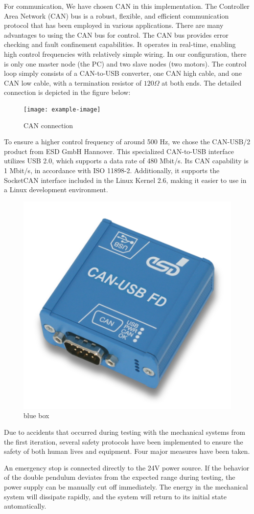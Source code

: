 For communication, We have chosen CAN in this implementation. The Controller Area Network (CAN) bus is a robust, flexible, and efficient communication protocol that has been employed in various applications. There are many advantages to using the CAN bus for control. The CAN bus provides error checking and fault confinement capabilities. It operates in real-time, enabling high control frequencies with relatively simple wiring. In our configuration, there is only one master node (the PC) and two slave nodes (two motors). The control loop simply consists of a CAN-to-USB converter, one CAN high cable, and one CAN low cable, with a termination resistor of \(120 \Omega\) at both ends. The detailed connection is depicted in the figure below:

\begin{figure}[H]
    \centering
    \texttt{[image: example-image]}
    \caption{CAN connection}
    \label{fig:my_label}
\end{figure}

To ensure a higher control frequency of around 500 Hz, we chose the CAN-USB/2 product from ESD GmbH Hannover. This specialized CAN-to-USB interface utilizes USB 2.0, which supports a data rate of 480 Mbit/s. Its CAN capability is 1 Mbit/s, in accordance with ISO 11898-2. Additionally, it supports the SocketCAN interface included in the Linux Kernel 2.6, making it easier to use in a Linux development environment.

\begin{figure}[H]
    \centering
    \includegraphics[width=0.3\linewidth]{figures/hardware_setup/can_blue_box.png}
    \caption{blue box}
    \label{fig:my_label}
\end{figure}

Due to accidents that occurred during testing with the mechanical systems from the first iteration, several safety protocols have been implemented to ensure the safety of both human lives and equipment. Four major measures have been taken.

An emergency stop is connected directly to the 24V power source. If the behavior of the double pendulum deviates from the expected range during testing, the power supply can be manually cut off immediately. The energy in the mechanical system will dissipate rapidly, and the system will return to its initial state automatically.

